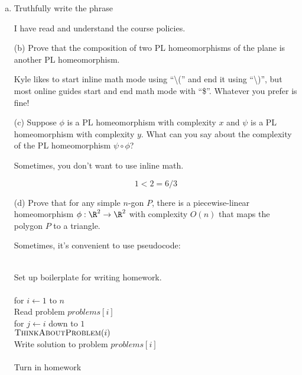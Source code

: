 \documentclass[11pt]{article}
\begin{document}
\begin{enumerate}[(a)]\itemsep0pt
  \item
    Truthfully write the phrase 

\begin{solution}
  I have read and understand the course policies.
\end{solution}

  \item[(b)]
    Prove that the composition of two PL homeomorphisms of the plane is another PL homeomorphism.

\begin{solution}
  Kyle likes to start inline math mode using ``\textbackslash('' and end it using
  ``\textbackslash)'', but most online guides start and end math mode with ``\$''.
  Whatever you prefer is fine!
\end{solution}

  \item[(c)]
    Suppose \(\phi\) is a PL homeomorphism with complexity \(x\) and \(\psi\) is a PL
    homeomorphism with complexity \(y\).
    What can you say about the complexity of the PL homeomorphism \(\psi \circ \phi\)?

\begin{solution}
    Sometimes, you don't want to use inline math.

    \[1 < 2 = 6 / 3\]
\end{solution}

  \item[(d)]
    Prove that for any simple \(n\)-gon \(P\), there is a piecewise-linear homeomorphism \(\phi :
    \R^2 \to \R^2\) with complexity \(O(n)\) that maps the polygon \(P\) to a triangle.

\begin{solution}
  Sometimes, it's convenient to use pseudocode:
  \begin{algo}
    \+
    \\  Set up boilerplate for writing homework.
    \\
    \\  for \(i \gets 1\) to \(n\)\+
    \\    Read problem \(problems[i]\)
    \\    for \(j \gets i\) down to \(1\)\+
    \\      \(\textsc{ThinkAboutProblem}(i)\)\-
    \\    Write solution to problem \(problems[i]\)\-
    \\
    \\  Turn in homework
  \end{algo}
\end{solution}


\end{enumerate}
\end{document}

